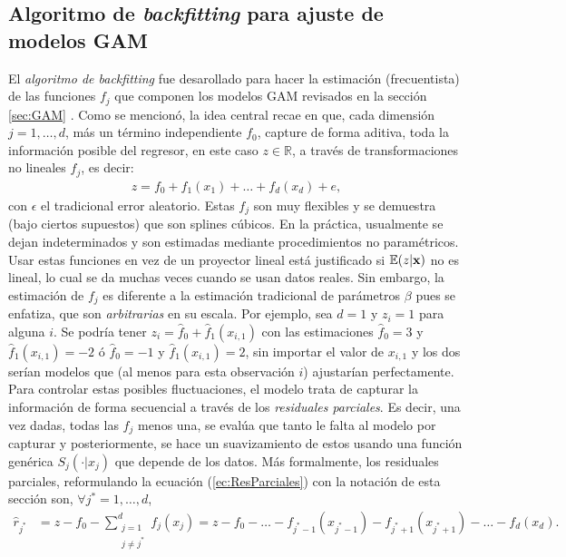 \documentclass[../Main/Main.tex]{subfiles}
\begin{document}
\subsection{Algoritmo de \textit{backfitting} para ajuste de modelos GAM} \label{sec:AlgoBackfitting}
El \textit{algoritmo de backfitting} fue desarollado para hacer la estimación (frecuentista) de las funciones $f_j$ que componen los modelos GAM revisados en la sección \ref{sec:GAM} \autocite{hastie1986generalized}. Como se mencionó, la idea central recae en que, cada dimensión $j = 1,\ldots,d$, más un término independiente $f_0$, capture de forma aditiva, toda la información posible del regresor, en este caso $z\in\mathbb{R}$, a través de transformaciones no lineales $f_j$, es decir:  
\begin{align}
	z = f_0 + f_1(x_1) + \ldots + f_d(x_d) + e, \label{ec:GAM}
\end{align}
con $\epsilon$ el tradicional error aleatorio. Estas $f_j$ son muy flexibles y se demuestra (bajo ciertos supuestos) que son splines cúbicos. En la práctica, usualmente se dejan indeterminados y son estimadas mediante procedimientos no paramétricos. Usar estas funciones en vez de un proyector lineal está justificado si $\mathbb{E}(z|\mathbf{x})$ no es lineal, lo cual se da muchas veces cuando se usan datos reales. Sin embargo, la estimación de $f_j$ es diferente a la estimación tradicional de parámetros $\beta$ pues se enfatiza, que son \textit{arbitrarias} en su escala. Por ejemplo, sea $d = 1$ y $z_i = 1$ para alguna $i$. Se podría tener $z_i = \hat{f}_0 + \hat{f}_1(x_{i,1})$  con las estimaciones $\hat{f}_0 = 3$ y $\hat{f}_1(x_{i,1}) = -2$ ó $\hat{f}_0 = -1$ y $\hat{f}_1(x_{i,1}) = 2$, sin importar el valor de $x_{i,1}$ y los dos serían modelos que (al menos para esta observación $i$) ajustarían perfectamente. Para controlar estas posibles fluctuaciones, el modelo trata de capturar la información de forma secuencial a través de los \textit{residuales parciales}. Es decir, una vez dadas, todas las $f_j$ menos una, se evalúa que tanto le falta al modelo por capturar y posteriormente, se hace un suavizamiento de estos usando una función genérica $S_j(\cdot|x_j)$ que depende de los datos. Más formalmente, los residuales parciales, reformulando la ecuación (\ref{ec:ResParciales}) con la notación de esta sección son, $\forall j^*=1,\ldots,d$,
\begin{align}
	\hat{r}_{j^*} &= z - f_0 - \sum_{\substack{j=1\\ j \neq j^*}}^d f_j(x_j) = z - f_0 -  \ldots - f_{j^*-1}(x_{j^*-1}) - f_{j^*+1}(x_{j^*+1}) - \ldots - f_d(x_d).  \label{ec:ResParciales2}
\end{align}
\end{document}
